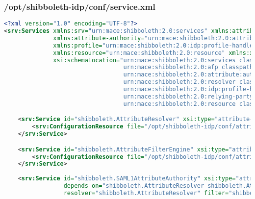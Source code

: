 \subsubsection{/opt/shibboleth-idp/conf/service.xml}
\begin{lstlisting}[language=xml]
<?xml version="1.0" encoding="UTF-8"?>
<srv:Services xmlns:srv="urn:mace:shibboleth:2.0:services" xmlns:attribute-afp="urn:mace:shibboleth:2.0:afp" 
              xmlns:attribute-authority="urn:mace:shibboleth:2.0:attribute:authority" xmlns:attribute-resolver="urn:mace:shibboleth:2.0:resolver" 
              xmlns:profile="urn:mace:shibboleth:2.0:idp:profile-handler" xmlns:relyingParty="urn:mace:shibboleth:2.0:relying-party" 
              xmlns:resource="urn:mace:shibboleth:2.0:resource" xmlns:xsi="http://www.w3.org/2001/XMLSchema-instance" 
              xsi:schemaLocation="urn:mace:shibboleth:2.0:services classpath:/schema/shibboleth-2.0-services.xsd
                                  urn:mace:shibboleth:2.0:afp classpath:/schema/shibboleth-2.0-afp.xsd
                                  urn:mace:shibboleth:2.0:attribute:authority classpath:/schema/shibboleth-2.0-attribute-authority.xsd
                                  urn:mace:shibboleth:2.0:resolver classpath:/schema/shibboleth-2.0-attribute-resolver.xsd
                                  urn:mace:shibboleth:2.0:idp:profile-handler classpath:/schema/shibboleth-2.0-idp-profile-handler.xsd
                                  urn:mace:shibboleth:2.0:relying-party classpath:/schema/shibboleth-2.0-relying-party.xsd
                                  urn:mace:shibboleth:2.0:resource classpath:/schema/shibboleth-2.0-resource.xsd">

    <srv:Service id="shibboleth.AttributeResolver" xsi:type="attribute-resolver:ShibbolethAttributeResolver" configurationResourcePollingFrequency="PT5M">
        <srv:ConfigurationResource file="/opt/shibboleth-idp/conf/attribute-resolver.xml" xsi:type="resource:FilesystemResource"/>
    </srv:Service>

    <srv:Service id="shibboleth.AttributeFilterEngine" xsi:type="attribute-afp:ShibbolethAttributeFilteringEngine" configurationResourcePollingFrequency="PT5M">
        <srv:ConfigurationResource file="/opt/shibboleth-idp/conf/attribute-filter.xml" xsi:type="resource:FilesystemResource"/>
    </srv:Service>
    
    <srv:Service id="shibboleth.SAML1AttributeAuthority" xsi:type="attribute-authority:SAML1AttributeAuthority" 
                 depends-on="shibboleth.AttributeResolver shibboleth.AttributeFilterEngine" 
                 resolver="shibboleth.AttributeResolver" filter="shibboleth.AttributeFilterEngine"/>
             

\end{lstlisting}
